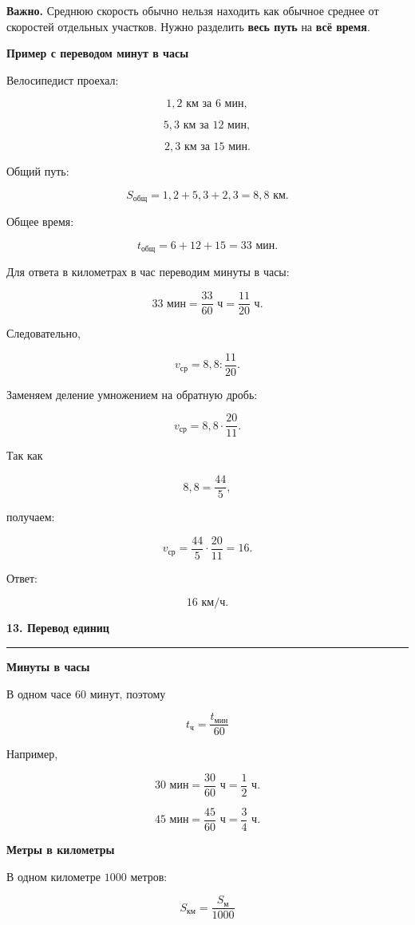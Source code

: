 \documentclass[a4paper,12pt]{article}
\newcommand{\topic}[1]{%
  \vspace{0.7em}
  {\Large\bfseries\color{darkaccent}#1}\par
  \vspace{0.25em}
  {\color{accent}\rule{\linewidth}{0.5pt}}
  \vspace{0.55em}
}
\newcommand{\subtopic}[1]{%
  \vspace{0.4em}
  {\large\bfseries\color{darkaccent}#1}\par
  \vspace{0.15em}
}
\newcommand{\important}[1]{%
  \par
  \vspace{0.25em}
  \noindent
  \textcolor{darkaccent}{\textbf{Важно.}} #1
  \par
}
\begin{document}
\important{
Среднюю скорость обычно нельзя находить как обычное среднее
от скоростей отдельных участков.
Нужно разделить \textbf{весь путь} на \textbf{всё время}.
}

\subtopic{Пример с переводом минут в часы}

Велосипедист проехал:

\[
1{,}2\text{ км за }6\text{ мин},
\]

\[
5{,}3\text{ км за }12\text{ мин},
\]

\[
2{,}3\text{ км за }15\text{ мин}.
\]

Общий путь:

\[
S_{\text{общ}}
=
1{,}2+5{,}3+2{,}3
=
8{,}8\text{ км}.
\]

Общее время:

\[
t_{\text{общ}}
=
6+12+15
=
33\text{ мин}.
\]

Для ответа в километрах в час переводим минуты в часы:

\[
33\text{ мин}
=
\frac{33}{60}\text{ ч}
=
\frac{11}{20}\text{ ч}.
\]

Следовательно,

\[
v_{\text{ср}}
=
8{,}8:\frac{11}{20}.
\]

Заменяем деление умножением на обратную дробь:

\[
v_{\text{ср}}
=
8{,}8\cdot\frac{20}{11}.
\]

Так как

\[
8{,}8=\frac{44}{5},
\]

получаем:

\[
v_{\text{ср}}
=
\frac{44}{5}\cdot\frac{20}{11}
=
16.
\]

Ответ:

\[
\boxed{16\text{ км/ч}}.
\]

\topic{13. Перевод единиц}

\subtopic{Минуты в часы}

В одном часе $60$ минут, поэтому

\[
\boxed{
t_{\text{ч}}=\frac{t_{\text{мин}}}{60}
}
\]

Например,

\[
30\text{ мин}
=
\frac{30}{60}\text{ ч}
=
\frac12\text{ ч}.
\]

\[
45\text{ мин}
=
\frac{45}{60}\text{ ч}
=
\frac34\text{ ч}.
\]

\subtopic{Метры в километры}

В одном километре $1000$ метров:

\[
\boxed{
S_{\text{км}}=\frac{S_{\text{м}}}{1000}
}
\]
\end{document}
